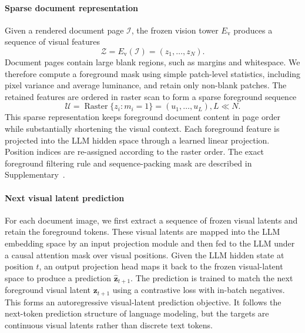 \paragraph{Sparse document representation}
Given a rendered document page $\mathcal{I}$, the frozen vision tower $E_{\mathrm{v}}$ produces a sequence of visual features
\begin{equation}
\mathcal{Z}=E_{\mathrm{v}}(\mathcal{I})=(z_1,\ldots,z_N).
\label{eq:visual_features}
\end{equation}
Document pages contain large blank regions, such as margins and whitespace. We therefore compute a foreground mask using simple patch-level statistics, including pixel variance and average luminance, and retain only non-blank patches. The retained features are ordered in raster scan to form a sparse foreground sequence
\begin{equation}
\mathcal{U}
=
\operatorname{Raster}\{z_i:m_i=1\}
=
(u_1,\ldots,u_L), L\ll N .
\label{eq:foreground_sequence}
\end{equation}
This sparse representation keeps foreground document content in page order while substantially shortening the visual context. Each foreground feature is projected into the LLM hidden space through a learned linear projection. Position indices are re-assigned according to the raster order. The exact foreground filtering rule and sequence-packing mask are described in Supplementary~.

\paragraph{Next visual latent prediction}
For each document image, we first extract a sequence of frozen visual latents and retain the foreground tokens.
These visual latents are mapped into the LLM embedding space by an input projection module and then fed to the LLM under a causal attention mask over visual positions.
Given the LLM hidden state at position $t$, an output projection head maps it back to the frozen visual-latent space to produce a prediction $\hat{\mathbf{z}}_{t+1}$.
The prediction is trained to match the next foreground visual latent $\mathbf{z}_{t+1}$ using a contrastive loss with in-batch negatives.
This forms an autoregressive visual-latent prediction objective. 
It follows the next-token prediction structure of language modeling, 
but the targets are continuous visual latents rather than discrete text tokens.


